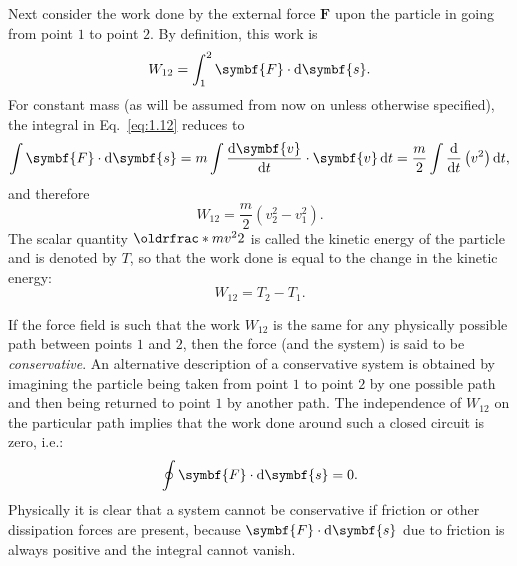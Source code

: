 Next consider the work done by the external force \(\symbf{F}\) upon the particle in going from point \(1\) to point \(2\). By definition, this work is
\begin{equation}
    W_{12}=\int_1^2\symbf{F}\cdot\odif{\symbf{s}}.\label{eq:1.12}
\end{equation}
For constant mass (as will be assumed from now on unless otherwise specified), the integral in Eq.~\eqref{eq:1.12} reduces to
\begin{equation*}
    \int\symbf{F}\cdot\odif{\symbf{s}}=m\int\odv{\symbf{v}}{t}\cdot\symbf{v}\odif{t}=\frac{m}{2}\int\odv*{\left(v^2\right)}{t}\odif{t},
\end{equation*}
and therefore
\begin{equation}
    W_{12}=\frac{m}{2}\left(v_2^2-v_1^2\right).
\end{equation}
The scalar quantity \(\rfrac{mv^2}{2}\) is called the kinetic energy of the particle and is denoted by \(T\), so that the work done is equal to the change in the kinetic energy:
\begin{equation}
    W_{12}=T_2-T_1.\label{eq:1.14}
\end{equation}

If the force field is such that the work \(W_{12}\) is the same for any physically possible path between points \(1\) and \(2\), then the force (and the system) is said to be \emph{conservative}. An alternative description of a conservative system is obtained by imagining the particle being taken from point \(1\) to point \(2\) by one possible path and then being returned to point \(1\) by another path. The independence of \(W_{12}\) on the particular path implies that the work done around such a closed circuit is zero, i.e.:
\begin{equation}
    \oint\symbf{F}\cdot\odif{\symbf{s}}=0.
\end{equation}
Physically it is clear that a system cannot be conservative if friction or other dissipation forces are present, because \(\symbf{F}\cdot\odif{\symbf{s}}\) due to friction is always positive and the integral cannot vanish.

